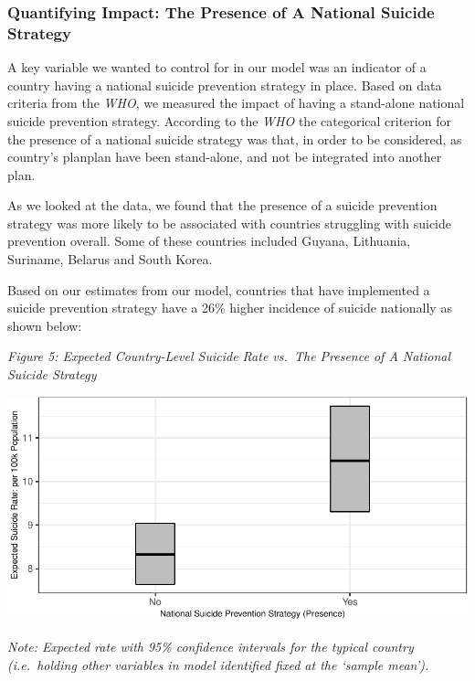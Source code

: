\documentclass[]{article}
\begin{document}
\subsubsection{Quantifying Impact: The Presence of A National Suicide
Strategy}\label{quantifying-impact-the-presence-of-a-national-suicide-strategy}

A key variable we wanted to control for in our model was an indicator of
a country having a national suicide prevention strategy in place. Based
on data criteria from the \emph{WHO}, we measured the impact of having a
stand-alone national suicide prevention strategy. According to the
\emph{WHO} the categorical criterion for the presence of a national
suicide strategy was that, in order to be considered, as country's
planplan have been stand-alone, and not be integrated into another plan.

As we looked at the data, we found that the presence of a suicide
prevention strategy was more likely to be associated with countries
struggling with suicide prevention overall. Some of these countries
included Guyana, Lithuania, Suriname, Belarus and South Korea.

Based on our estimates from our model, countries that have implemented a
suicide prevention strategy have a 26\% higher incidence of suicide
nationally as shown below:

\newpage 

\emph{Figure 5: Expected Country-Level Suicide Rate vs.~The Presence of
A National Suicide Strategy}

\begin{center}\includegraphics{Project_Report_files/figure-latex/sstrat_plot-1} \end{center}

\emph{Note: Expected rate with 95\% confidence intervals for the typical
country (i.e.~holding other variables in model identified fixed at the
`sample mean').}
\end{document}
